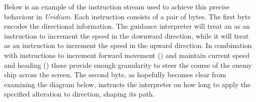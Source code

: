 Below is an example of the instruction stream used to achieve this precise behaviour in \textit{Uridium}. Each instruction consists of a
pair of bytes. The first byte encodes the directional information. The guidance interpreter will treat an 
as an instruction to increment the speed in the downward direction, while it will treat  as an instruction
to increment the speed in the upward direction. In combination with instructions to increment forward movement ()
and maintain current speed and heading () these provide enough granularity to steer the course of the enemy
ship across the screen. The second byte, as hopefully becomes clear from examining the diagram below, instructs the interpreter
on how long to apply the specified alteration to direction, shaping its path. 

